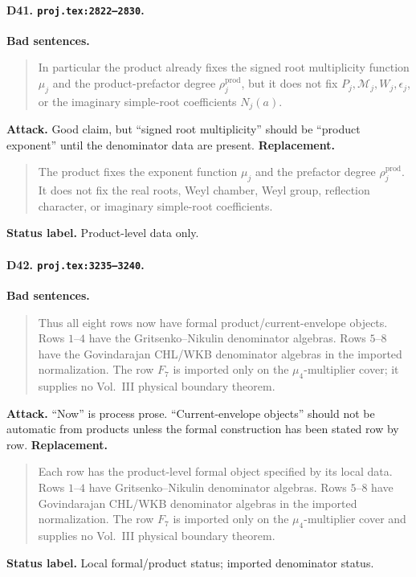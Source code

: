 \paragraph{D41. \texttt{proj.tex:2822--2830}.}
\textbf{Bad sentences.}
\begin{quote}\small
In particular the product already fixes the signed root multiplicity
function \(\mu_j\) and the product-prefactor degree \(\rho_j^{\mathrm{prod}}\),
but it does not fix \(P_j,\mathcal M_j,W_j,\epsilon_j\), or the imaginary
simple-root coefficients \(N_j(a)\).
\end{quote}
\textbf{Attack.}
Good claim, but ``signed root multiplicity'' should be ``product
exponent'' until the denominator data are present.
\textbf{Replacement.}
\begin{quote}\small
The product fixes the exponent function \(\mu_j\) and the prefactor
degree \(\rho_j^{\mathrm{prod}}\).  It does not fix the real roots, Weyl
chamber, Weyl group, reflection character, or imaginary simple-root
coefficients.
\end{quote}
\textbf{Status label.} Product-level data only.

\paragraph{D42. \texttt{proj.tex:3235--3240}.}
\textbf{Bad sentences.}
\begin{quote}\small
Thus all eight rows now have formal product/current-envelope objects.
Rows \(1\)--\(4\) have the Gritsenko--Nikulin denominator algebras.
Rows \(5\)--\(8\) have the Govindarajan CHL/WKB denominator algebras in
the imported normalization.  The row \(F_7\) is imported only on the
\(\mu_4\)-multiplier cover; it supplies no Vol.~III physical boundary
theorem.
\end{quote}
\textbf{Attack.}
``Now'' is process prose.  ``Current-envelope objects'' should not be
automatic from products unless the formal construction has been stated
row by row.
\textbf{Replacement.}
\begin{quote}\small
Each row has the product-level formal object specified by its local data.
Rows \(1\)--\(4\) have Gritsenko--Nikulin denominator algebras.  Rows
\(5\)--\(8\) have Govindarajan CHL/WKB denominator algebras in the
imported normalization.  The row \(F_7\) is imported only on the
\(\mu_4\)-multiplier cover and supplies no Vol.~III physical boundary
theorem.
\end{quote}
\textbf{Status label.} Local formal/product status; imported denominator
status.

